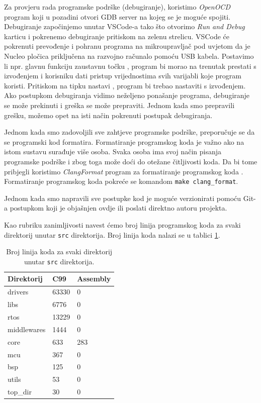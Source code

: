 \documentclass[times, utf8, diplomski, numeric]{templates/template}
\begin{document}
{{        Za provjeru rada programske podrške (debugiranje), koristimo \emph{OpenOCD} \cite{openocd} program koji u pozadini otvori GDB \cite{gdb} server na kojeg se je moguće spojiti. Debugiranje započinjemo unutar VSCode-a tako što otvorimo \emph{Run and Debug} karticu i pokrenemo debugiranje pritiskom na zelenu strelicu. VSCode će pokrenuti prevođenje i pohranu programa na mikroupravljač pod uvjetom da je Nucleo pločica priključena na razvojno računalo pomoću USB kabela. Postavimo li npr. glavnu funkciju zaustavnu točku , program bi morao na trenutak prestati s izvođenjem i korisniku dati pristup vrijednostima svih varijabli koje program koristi. Pritiskom na tipku nastavi , program bi trebao nastaviti s izvođenjem. Ako postupkom debugiranja vidimo neželjeno ponašanje programa, debugiranje se može prekinuti i greška se može prepraviti. Jednom kada smo prepravili grešku, možemo opet na isti način pokrenuti postupak debugiranja.

        Jednom kada smo zadovoljili sve zahtjeve programske podrške, preporučuje se da se programski kod formatira. Formatiranje programskog koda je važno ako na istom sustavu surađuje više osoba. Svaka osoba ima svoj način pisanja programske podrške i zbog toga može doći do otežane čitljivosti koda. Da bi tome pribjegli koristimo \emph{ClangFormat} program za formatiranje programskog koda \cite{clang_format}. Formatiranje programskog koda pokreće se komandom \texttt{make clang\_format}.

        Jednom kada smo napravili sve postupke kod je moguće verzionirati pomoću Git-a postupkom koji je objašnjen ovdje \cite{git_commit_instrukcije} ili poslati direktno autoru projekta.

        Kao rubriku zanimljivosti navest ćemo broj linija programskog koda za svaki direktorij unutar \texttt{src} direktorija. Broj linija koda nalazi se u tablici \ref{tbl:broj_linija}.

        \begin{table}[htb]
        \caption{Broj linija koda za svaki direktorij unutar \texttt{src} direktorija.}
        \label{tbl:broj_linija}
        \centering
        \begin{tabular}{lll} 
        \toprule
        Direktorij & C99 & Assembly \\ 
        \midrule
        drivers     &     63330    &   0    \\
        libs        &     6776     &   0    \\
        rtos        &     13229    &   0    \\
        middlewares &     1444     &   0    \\
        core        &     633      &   283  \\
        mcu         &     367      &   0    \\
        bsp         &     125      &   0    \\
        utils       &     53       &   0    \\
        top\_dir    &     30       &   0    \\
        \bottomrule
        \end{tabular}
        \end{table}
    }
}
\end{document}
